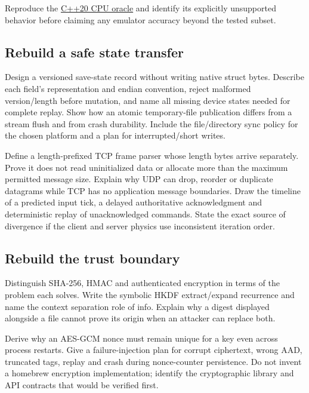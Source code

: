 Reproduce the \hyperref[source-file-552a9e2296dc984412c8f06d]{C++20 CPU oracle} and identify its explicitly unsupported behavior before claiming any emulator accuracy beyond the tested subset.

\subsection{Rebuild a safe state transfer}\label{appendix-11f73b337e37-rebuild-a-safe-state-transfer}

Design a versioned save-state record without writing native struct bytes. Describe each field's representation and endian convention, reject malformed version/length before mutation, and name all missing device states needed for complete replay. Show how an atomic temporary-file publication differs from a stream flush and from crash durability. Include the file/directory sync policy for the chosen platform and a plan for interrupted/short writes.

Define a length-prefixed TCP frame parser whose length bytes arrive separately. Prove it does not read uninitialized data or allocate more than the maximum permitted message size. Explain why UDP can drop, reorder or duplicate datagrams while TCP has no application message boundaries. Draw the timeline of a predicted input tick, a delayed authoritative acknowledgment and deterministic replay of unacknowledged commands. State the exact source of divergence if the client and server physics use inconsistent iteration order.

\subsection{Rebuild the trust boundary}\label{appendix-11f73b337e37-rebuild-the-trust-boundary}

Distinguish SHA-256, HMAC and authenticated encryption in terms of the problem each solves. Write the symbolic HKDF extract/expand recurrence and name the context separation role of info. Explain why a digest displayed alongside a file cannot prove its origin when an attacker can replace both.

Derive why an AES-GCM nonce must remain unique for a key even across process restarts. Give a failure-injection plan for corrupt ciphertext, wrong AAD, truncated tags, replay and crash during nonce-counter persistence. Do not invent a homebrew encryption implementation; identify the cryptographic library and API contracts that would be verified first.


